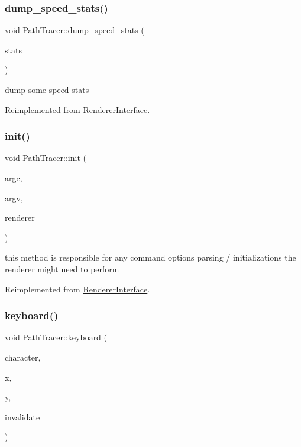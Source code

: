 \subsubsection{\texorpdfstring{dump\+\_\+speed\+\_\+stats()}{dump\_speed\_stats()}}
{\footnotesize\ttfamily void Path\+Tracer\+::dump\+\_\+speed\+\_\+stats (\begin{DoxyParamCaption}\item[{F\+I\+LE $\ast$}]{stats }\end{DoxyParamCaption})\hspace{0.3cm}{\ttfamily [virtual]}}

dump some speed stats 

Reimplemented from \hyperlink{struct_renderer_interface_a378df3aa18095da5ce8011fb25c8fb8e}{Renderer\+Interface}.

\mbox{\label{group___p_t_module_details_ga923b8d146b23f93356f6c74971c4d6f7}} 
\subsubsection{\texorpdfstring{init()}{init()}}
{\footnotesize\ttfamily void Path\+Tracer\+::init (\begin{DoxyParamCaption}\item[{int}]{argc,  }\item[{char $\ast$$\ast$}]{argv,  }\item[{\hyperlink{struct_rendering_context}{Rendering\+Context} \&}]{renderer }\end{DoxyParamCaption})\hspace{0.3cm}{\ttfamily [virtual]}}

this method is responsible for any command options parsing / initializations the renderer might need to perform 

Reimplemented from \hyperlink{struct_renderer_interface_a2ead9b943d6d48fcd32872e0005ebe63}{Renderer\+Interface}.

\mbox{\label{group___p_t_module_details_gad08f55d7ba075e0b71a4aa729c07986d}} 
\subsubsection{\texorpdfstring{keyboard()}{keyboard()}}
{\footnotesize\ttfamily void Path\+Tracer\+::keyboard (\begin{DoxyParamCaption}\item[{unsigned char}]{character,  }\item[{int}]{x,  }\item[{int}]{y,  }\item[{bool \&}]{invalidate }\end{DoxyParamCaption})\hspace{0.3cm}{\ttfamily [virtual]}}

